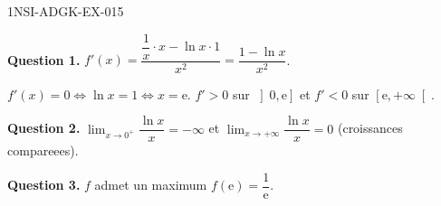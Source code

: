 \begin{corrige}{1NSI-ADGK-EX-015}

\textbf{Question 1.} $f'(x) = \dfrac{\dfrac{1}{x} \cdot x - \ln x \cdot 1}{x^2} = \dfrac{1 - \ln x}{x^2}$.


$f'(x) = 0 \iff \ln x = 1 \iff x = \mathrm{e}$. $f' > 0$ sur $\left]0, \mathrm{e}\right]$ et $f' < 0$ sur $\left[\mathrm{e}, +\infty\right[$.

\textbf{Question 2.} $\lim_{x \to 0^+} \dfrac{\ln x}{x} = -\infty$ et $\lim_{x \to +\infty} \dfrac{\ln x}{x} = 0$ (croissances compareees).

\textbf{Question 3.} $f$ admet un maximum $f(\mathrm{e}) = \dfrac{1}{\mathrm{e}}$.

\end{corrige}
